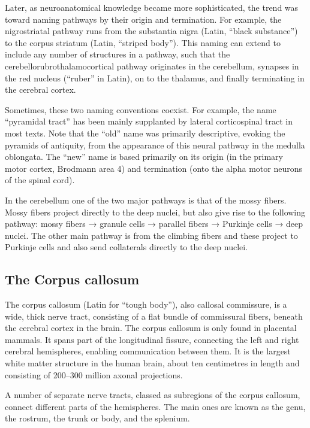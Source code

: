 \documentclass[]{book}
\begin{document}
Later, as neuroanatomical knowledge became more sophisticated, the trend was toward naming pathways by their origin and termination. For example, the nigrostriatal pathway runs from the substantia nigra (Latin, ``black substance'') to the corpus striatum (Latin, ``striped body''). This naming can extend to include any number of structures in a pathway, such that the cerebellorubrothalamocortical pathway originates in the cerebellum, synapses in the red nucleus (``ruber'' in Latin), on to the thalamus, and finally terminating in the cerebral cortex.

Sometimes, these two naming conventions coexist. For example, the name ``pyramidal tract'' has been mainly supplanted by lateral corticospinal tract in most texts. Note that the ``old'' name was primarily descriptive, evoking the pyramids of antiquity, from the appearance of this neural pathway in the medulla oblongata. The ``new'' name is based primarily on its origin (in the primary motor cortex, Brodmann area 4) and termination (onto the alpha motor neurons of the spinal cord).

In the cerebellum one of the two major pathways is that of the mossy fibers. Mossy fibers project directly to the deep nuclei, but also give rise to the following pathway: mossy fibers → granule cells → parallel fibers → Purkinje cells → deep nuclei. The other main pathway is from the climbing fibers and these project to Purkinje cells and also send collaterals directly to the deep nuclei.

\hypertarget{the-corpus-callosum}{%
\subsection{The Corpus callosum}\label{the-corpus-callosum}}

The corpus callosum (Latin for ``tough body''), also callosal commissure, is a wide, thick nerve tract, consisting of a flat bundle of commissural fibers, beneath the cerebral cortex in the brain. The corpus callosum is only found in placental mammals. It spans part of the longitudinal fissure, connecting the left and right cerebral hemispheres, enabling communication between them. It is the largest white matter structure in the human brain, about ten centimetres in length and consisting of 200--300 million axonal projections.

A number of separate nerve tracts, classed as subregions of the corpus callosum, connect different parts of the hemispheres. The main ones are known as the genu, the rostrum, the trunk or body, and the splenium.
\end{document}
